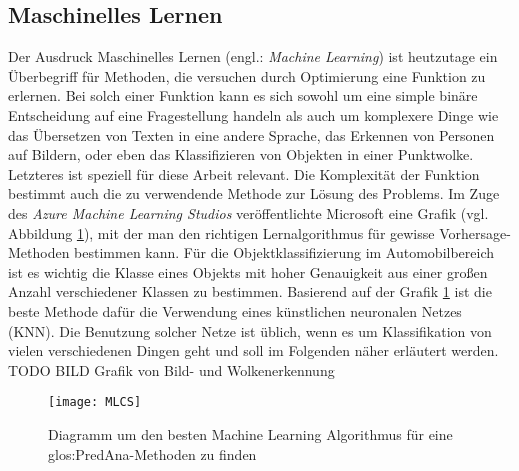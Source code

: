 \subsection{Maschinelles Lernen}
\label{sec:MLearning}
Der Ausdruck Maschinelles Lernen (engl.: \textit{Machine Learning}) ist heutzutage ein Überbegriff für Methoden, die versuchen durch Optimierung eine Funktion zu erlernen. Bei solch einer Funktion kann es sich sowohl um eine simple binäre Entscheidung auf eine Fragestellung handeln als auch um komplexere Dinge wie das Übersetzen von Texten in eine andere Sprache, das Erkennen von Personen auf Bildern, oder eben das Klassifizieren von Objekten in einer Punktwolke. Letzteres ist speziell für diese Arbeit relevant. Die Komplexität der Funktion bestimmt auch die zu verwendende Methode zur Lösung des Problems. Im Zuge des \textit{Azure Machine Learning Studios} veröffentlichte Microsoft eine Grafik (vgl. Abbildung \ref{fig:MLCS}), mit der man den richtigen Lernalgorithmus für gewisse Vorhersage-Methoden bestimmen kann. Für die Objektklassifizierung im Automobilbereich ist es wichtig die Klasse eines Objekts mit hoher Genauigkeit aus einer großen Anzahl verschiedener Klassen zu bestimmen. Basierend auf der Grafik \ref{fig:MLCS} ist die beste Methode dafür die Verwendung eines künstlichen neuronalen Netzes (KNN). Die Benutzung solcher Netze ist üblich, wenn es um Klassifikation von vielen verschiedenen Dingen geht und soll im Folgenden näher erläutert werden.\\

TODO BILD Grafik von Bild- und Wolkenerkennung\\

\begin{figure}%
	\centering
    \texttt{[image: MLCS]}
    \caption{Diagramm um den besten Machine Learning Algorithmus für eine \gls{glos:PredAna}-Methoden zu finden \cite{bib:AzureCs}}
    \label{fig:MLCS}
\end{figure}
  
